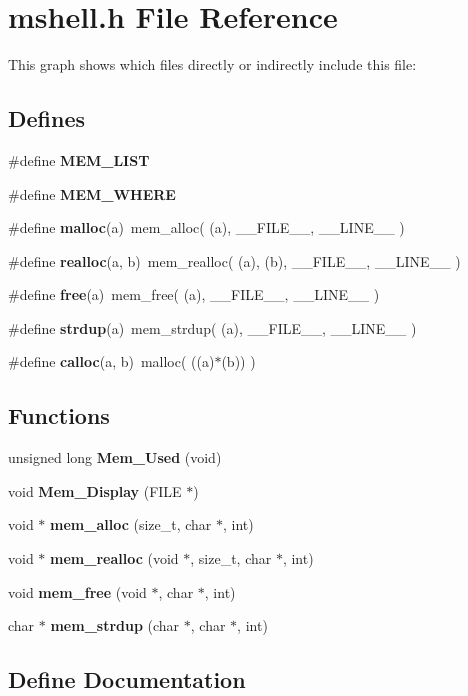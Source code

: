 \section{mshell.h File Reference}
\label{mshell_8h}


This graph shows which files directly or indirectly include this file:\subsection*{Defines}
\begin{CompactItemize}
\item 
\#define {\bf MEM\_\-LIST}
\item 
\#define {\bf MEM\_\-WHERE}
\item 
\#define {\bf malloc}(a)\ mem\_\-alloc( (a), \_\-\_\-FILE\_\-\_\-, \_\-\_\-LINE\_\-\_\- )
\item 
\#define {\bf realloc}(a, b)\ mem\_\-realloc( (a), (b), \_\-\_\-FILE\_\-\_\-, \_\-\_\-LINE\_\-\_\- )
\item 
\#define {\bf free}(a)\ mem\_\-free( (a), \_\-\_\-FILE\_\-\_\-, \_\-\_\-LINE\_\-\_\- )
\item 
\#define {\bf strdup}(a)\ mem\_\-strdup( (a), \_\-\_\-FILE\_\-\_\-, \_\-\_\-LINE\_\-\_\- )
\item 
\#define {\bf calloc}(a, b)\ malloc( ((a)$\ast$(b)) )
\end{CompactItemize}
\subsection*{Functions}
\begin{CompactItemize}
\item 
unsigned long {\bf Mem\_\-Used} (void)
\item 
void {\bf Mem\_\-Display} (FILE $\ast$)
\item 
void $\ast$ {\bf mem\_\-alloc} (size\_\-t, char $\ast$, int)
\item 
void $\ast$ {\bf mem\_\-realloc} (void $\ast$, size\_\-t, char $\ast$, int)
\item 
void {\bf mem\_\-free} (void $\ast$, char $\ast$, int)
\item 
char $\ast$ {\bf mem\_\-strdup} (char $\ast$, char $\ast$, int)
\end{CompactItemize}


\subsection{Define Documentation}
